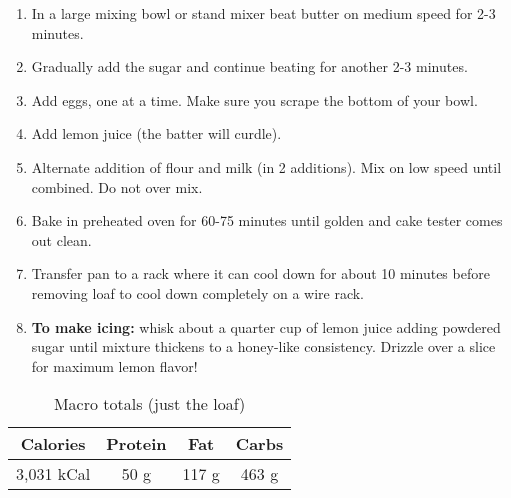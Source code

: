 \begin{multicols}{2}
\begin{enumerate}
\item In a large mixing bowl or stand mixer beat butter on medium speed for 2-3 minutes.
\medskip 
\item Gradually add the sugar and continue beating for another 2-3 minutes.
\medskip 
\item Add eggs, one at a time. Make sure you scrape the bottom of your bowl.
\medskip
\item Add lemon juice (the batter will curdle).
\medskip
\item Alternate addition of flour and milk (in 2 additions). Mix on low speed until combined. Do not over mix.
\medskip
\item Bake in preheated oven for 60-75 minutes until golden and cake tester comes out clean.
\medskip
\item Transfer pan to a rack where it can cool down for about 10 minutes before removing loaf to cool down completely on a wire rack.
\medskip \item \textbf{To make icing:} whisk about a quarter cup of lemon juice adding powdered sugar until mixture thickens to a honey-like consistency. Drizzle over a slice for maximum lemon flavor! 
\end{enumerate}
\begin{table}[H]
  \begin{center}
    \caption{Macro totals (just the loaf)}
    \label{tab:table1}
    \begin{tabular}{c|c|c|c} %
      \textbf{Calories} & \textbf{Protein} & \textbf{Fat} & \textbf{Carbs}\\
      \hline
      3,031 kCal & 50 g & 117 g & 463 g\\
    \end{tabular}
  \end{center}
\end{table}
\end{multicols}